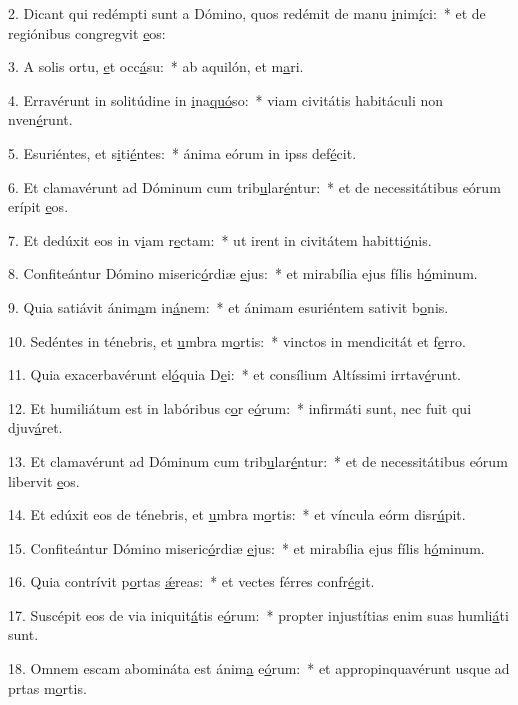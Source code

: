 2. Dicant qui redémpti sunt a Dómino, quos redémit de manu \uline{i}nim\uline{í}ci:~* et de regiónibus congregvit \uline{e}os:\par 
3. A solis ortu, \uline{e}t occ\uline{á}su:~* ab aquilón, et m\uline{a}ri.\par 
4. Erravérunt in solitúdine in \uline{i}na\uline{quó}so:~* viam civitátis habitáculi non nven\uline{é}runt.\par 
5. Esuriéntes, et s\uline{i}ti\uline{é}ntes:~* ánima eórum in ipss def\uline{é}cit.\par 
6. Et clamavérunt ad Dóminum cum trib\uline{u}lar\uline{é}ntur:~* et de necessitátibus eórum erípit \uline{e}os.\par 
7. Et dedúxit eos in v\uline{i}am r\uline{e}ctam:~* ut irent in civitátem habitti\uline{ó}nis.\par 
8. Confiteántur Dómino miseric\uline{ó}rdiæ \uline{e}jus:~* et mirabília ejus fílis h\uline{ó}minum.\par 
9. Quia satiávit ánim\uline{a}m in\uline{á}nem:~* et ánimam esuriéntem sativit b\uline{o}nis.\par 
10. Sedéntes in ténebris, et \uline{u}mbra m\uline{o}rtis:~* vinctos in mendicitát et f\uline{e}rro.\par 
11. Quia exacerbavérunt el\uline{ó}quia D\uline{e}i:~* et consílium Altíssimi irrtav\uline{é}runt.\par 
12. Et humiliátum est in labóribus c\uline{o}r e\uline{ó}rum:~* infirmáti sunt, nec fuit qui djuv\uline{á}ret.\par 
13. Et clamavérunt ad Dóminum cum trib\uline{u}lar\uline{é}ntur:~* et de necessitátibus eórum libervit \uline{e}os.\par 
14. Et edúxit eos de ténebris, et \uline{u}mbra m\uline{o}rtis:~* et víncula eórm disr\uline{ú}pit.\par 
15. Confiteántur Dómino miseric\uline{ó}rdiæ \uline{e}jus:~* et mirabília ejus fílis h\uline{ó}minum.\par 
16. Quia contrívit p\uline{o}rtas \uline{ǽ}reas:~* et vectes férres confr\uline{é}git.\par 
17. Suscépit eos de via iniquit\uline{á}tis e\uline{ó}rum:~* propter injustítias enim suas humli\uline{á}ti sunt.\par 
18. Omnem escam abomináta est ánim\uline{a} e\uline{ó}rum:~* et appropinquavérunt usque ad prtas m\uline{o}rtis.\par 
